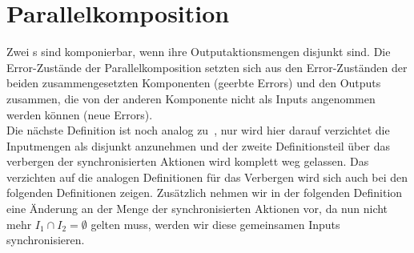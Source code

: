 \section{Parallelkomposition}
Zwei \EIO{}s sind komponierbar, wenn ihre Outputaktionsmengen disjunkt sind. Die
Error-Zustände der Parallelkomposition setzten sich aus den Error-Zuständen der
beiden zusammengesetzten Komponenten (geerbte Errors) und den Outputs zusammen, die von der
anderen Komponente nicht als Inputs angenommen werden können (neue Errors).\\
Die nächste Definition ist noch analog zu~\cite{Vogler2014EIO}, nur wird hier
darauf verzichtet die Inputmengen als disjunkt anzunehmen und der zweite
Definitionsteil über das verbergen der synchronisierten Aktionen wird
komplett weg gelassen. Das verzichten auf die analogen Definitionen für das
Verbergen wird sich auch bei den folgenden Definitionen zeigen. Zusätzlich
nehmen wir in der folgenden Definition eine Änderung an der Menge der
synchronisierten Aktionen vor, da nun nicht mehr $I_1\cap I_2 =\emptyset$
gelten muss, werden wir diese gemeinsamen Inputs synchronisieren.

